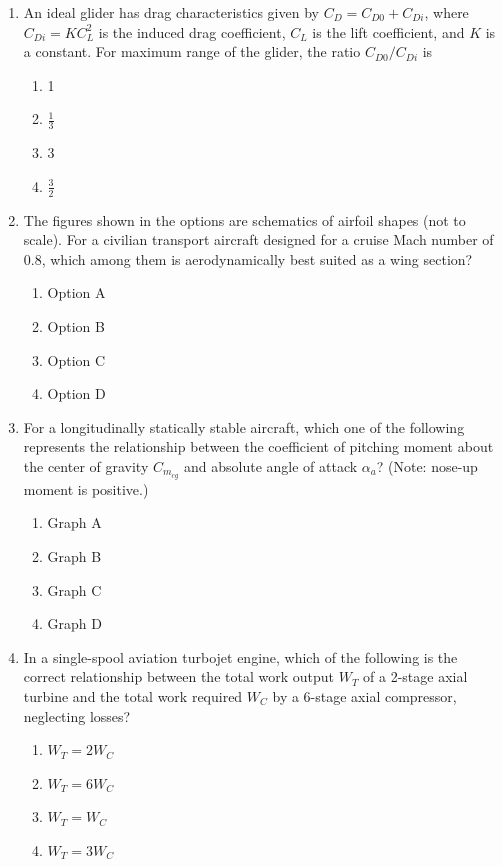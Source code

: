 \documentclass{article}
\begin{document}
\begin{enumerate}[leftmargin=*, resume]
\item An ideal glider has drag characteristics given by $C_D = C_{D0} + C_{Di}$, where $C_{Di} = KC_L^2$ is the induced drag coefficient, $C_L$ is the lift coefficient, and $K$ is a constant. For maximum range of the glider, the ratio $C_{D0}/C_{Di}$ is
\begin{multicols}{4}
\begin{enumerate}
\item 1
\item $\frac{1}{3}$
\item 3
\item $\frac{3}{2}$
\end{enumerate}
\end{multicols}

\item The figures shown in the options are schematics of airfoil shapes (not to scale). For a civilian transport aircraft designed for a cruise Mach number of 0.8, which among them is aerodynamically best suited as a wing section?
\begin{multicols}{4}
\begin{enumerate}
\item Option A
\item Option B
\item Option C
\item Option D
\end{enumerate}
\end{multicols}

\item For a longitudinally statically stable aircraft, which one of the following represents the relationship between the coefficient of pitching moment about the center of gravity $C_{m_{cg}}$ and absolute angle of attack $\alpha_a$? (Note: nose-up moment is positive.)
\begin{multicols}{2}
\begin{enumerate}
\item Graph A
\item Graph B
\item Graph C
\item Graph D
\end{enumerate}
\end{multicols}

\item In a single-spool aviation turbojet engine, which of the following is the correct relationship between the total work output $W_T$ of a 2-stage axial turbine and the total work required $W_C$ by a 6-stage axial compressor, neglecting losses?
\begin{multicols}{4}
\begin{enumerate}
\item $W_T = 2W_C$
\item $W_T = 6W_C$
\item $W_T = W_C$
\item $W_T = 3W_C$
\end{enumerate}
\end{multicols}


\end{enumerate}
\end{document}
